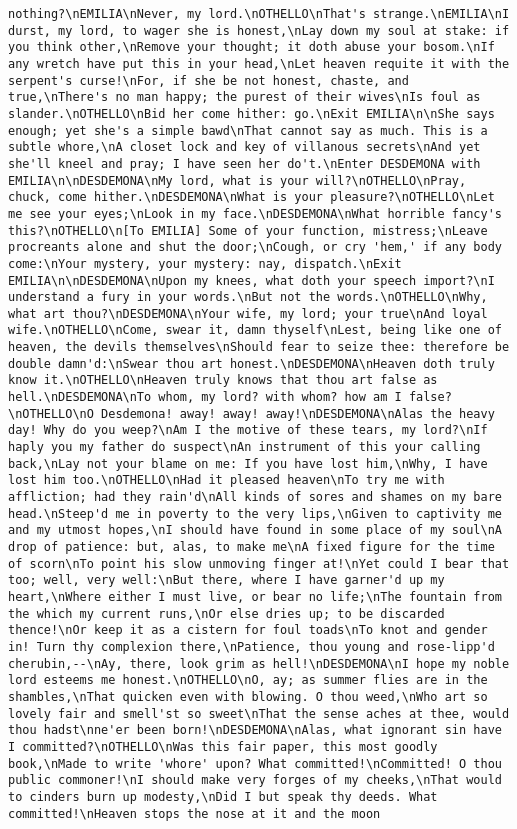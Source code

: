 \begin{verbatim}
nothing?\nEMILIA\nNever, my lord.\nOTHELLO\nThat's strange.\nEMILIA\nI durst, my lord, to wager she is honest,\nLay down my soul at stake: if you think other,\nRemove your thought; it doth abuse your bosom.\nIf any wretch have put this in your head,\nLet heaven requite it with the serpent's curse!\nFor, if she be not honest, chaste, and true,\nThere's no man happy; the purest of their wives\nIs foul as slander.\nOTHELLO\nBid her come hither: go.\nExit EMILIA\n\nShe says enough; yet she's a simple bawd\nThat cannot say as much. This is a subtle whore,\nA closet lock and key of villanous secrets\nAnd yet she'll kneel and pray; I have seen her do't.\nEnter DESDEMONA with EMILIA\n\nDESDEMONA\nMy lord, what is your will?\nOTHELLO\nPray, chuck, come hither.\nDESDEMONA\nWhat is your pleasure?\nOTHELLO\nLet me see your eyes;\nLook in my face.\nDESDEMONA\nWhat horrible fancy's this?\nOTHELLO\n[To EMILIA] Some of your function, mistress;\nLeave procreants alone and shut the door;\nCough, or cry 'hem,' if any body come:\nYour mystery, your mystery: nay, dispatch.\nExit EMILIA\n\nDESDEMONA\nUpon my knees, what doth your speech import?\nI understand a fury in your words.\nBut not the words.\nOTHELLO\nWhy, what art thou?\nDESDEMONA\nYour wife, my lord; your true\nAnd loyal wife.\nOTHELLO\nCome, swear it, damn thyself\nLest, being like one of heaven, the devils themselves\nShould fear to seize thee: therefore be double damn'd:\nSwear thou art honest.\nDESDEMONA\nHeaven doth truly know it.\nOTHELLO\nHeaven truly knows that thou art false as hell.\nDESDEMONA\nTo whom, my lord? with whom? how am I false?\nOTHELLO\nO Desdemona! away! away! away!\nDESDEMONA\nAlas the heavy day! Why do you weep?\nAm I the motive of these tears, my lord?\nIf haply you my father do suspect\nAn instrument of this your calling back,\nLay not your blame on me: If you have lost him,\nWhy, I have lost him too.\nOTHELLO\nHad it pleased heaven\nTo try me with affliction; had they rain'd\nAll kinds of sores and shames on my bare head.\nSteep'd me in poverty to the very lips,\nGiven to captivity me and my utmost hopes,\nI should have found in some place of my soul\nA drop of patience: but, alas, to make me\nA fixed figure for the time of scorn\nTo point his slow unmoving finger at!\nYet could I bear that too; well, very well:\nBut there, where I have garner'd up my heart,\nWhere either I must live, or bear no life;\nThe fountain from the which my current runs,\nOr else dries up; to be discarded thence!\nOr keep it as a cistern for foul toads\nTo knot and gender in! Turn thy complexion there,\nPatience, thou young and rose-lipp'd cherubin,--\nAy, there, look grim as hell!\nDESDEMONA\nI hope my noble lord esteems me honest.\nOTHELLO\nO, ay; as summer flies are in the shambles,\nThat quicken even with blowing. O thou weed,\nWho art so lovely fair and smell'st so sweet\nThat the sense aches at thee, would thou hadst\nne'er been born!\nDESDEMONA\nAlas, what ignorant sin have I committed?\nOTHELLO\nWas this fair paper, this most goodly book,\nMade to write 'whore' upon? What committed!\nCommitted! O thou public commoner!\nI should make very forges of my cheeks,\nThat would to cinders burn up modesty,\nDid I but speak thy deeds. What committed!\nHeaven stops the nose at it and the moon 
\end{verbatim}
